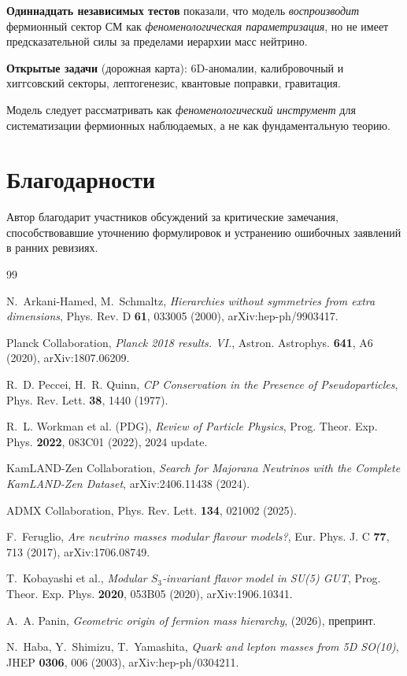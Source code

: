 \documentclass[11pt,a4paper]{article}
\numberwithin{equation}{section}
\begin{document}
\textbf{Одиннадцать независимых тестов} показали,
что модель \emph{воспроизводит} фермионный сектор
СМ как \emph{феноменологическая параметризация},
но не имеет предсказательной силы за пределами
иерархии масс нейтрино.

\textbf{Открытые задачи} (дорожная карта):
6D-аномалии, калибровочный и хиггсовский секторы,
лептогенезис, квантовые поправки, гравитация.

Модель следует рассматривать как
\emph{феноменологический инструмент} для
систематизации фермионных наблюдаемых,
а не как фундаментальную теорию.

\vspace{0.5cm}

\section*{Благодарности}

Автор благодарит участников обсуждений за
критические замечания, способствовавшие
уточнению формулировок и устранению
ошибочных заявлений в ранних ревизиях.

\vspace{0.3cm}

\begin{thebibliography}{99}

N.~Arkani-Hamed, M.~Schmaltz,
\textit{Hierarchies without symmetries from extra dimensions},
Phys. Rev. D \textbf{61}, 033005 (2000), arXiv:hep-ph/9903417.

Planck Collaboration,
\textit{Planck 2018 results. VI.},
Astron. Astrophys. \textbf{641}, A6 (2020), arXiv:1807.06209.

R.~D. Peccei, H.~R. Quinn,
\textit{CP Conservation in the Presence of Pseudoparticles},
Phys. Rev. Lett. \textbf{38}, 1440 (1977).

R.~L. Workman et al. (PDG),
\textit{Review of Particle Physics},
Prog. Theor. Exp. Phys. \textbf{2022}, 083C01 (2022),
2024 update.

KamLAND-Zen Collaboration,
\textit{Search for Majorana Neutrinos with the Complete
KamLAND-Zen Dataset}, arXiv:2406.11438 (2024).

ADMX Collaboration,
Phys. Rev. Lett. \textbf{134}, 021002 (2025).

F.~Feruglio,
\textit{Are neutrino masses modular flavour models?},
Eur. Phys. J. C \textbf{77}, 713 (2017), arXiv:1706.08749.

T.~Kobayashi et al.,
\textit{Modular $S_3$-invariant flavor model in SU(5) GUT},
Prog. Theor. Exp. Phys. \textbf{2020}, 053B05 (2020),
arXiv:1906.10341.

A.~A. Panin,
\textit{Geometric origin of fermion mass hierarchy},
(2026), препринт.

N.~Haba, Y.~Shimizu, T.~Yamashita,
\textit{Quark and lepton masses from 5D SO(10)},
JHEP \textbf{0306}, 006 (2003), arXiv:hep-ph/0304211.

\end{thebibliography}
\end{document}
